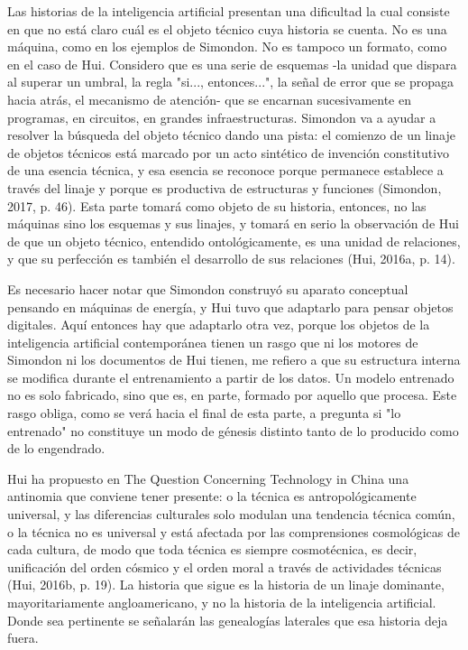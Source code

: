 Las historias de la inteligencia artificial presentan una dificultad la cual consiste en que no está claro cuál es el objeto técnico cuya historia se cuenta. No es una máquina, como en los ejemplos de Simondon. No es tampoco un formato, como en el caso de Hui. Considero que es una serie de esquemas -la unidad que dispara al superar un umbral, la regla "si..., entonces...", la señal de error que se propaga hacia atrás, el mecanismo de atención- que se encarnan sucesivamente en programas, en circuitos, en grandes infraestructuras. Simondon va a ayudar a resolver la búsqueda del objeto técnico dando una pista: el comienzo de un linaje de objetos técnicos está marcado por un acto sintético de invención constitutivo de una esencia técnica, y esa esencia se reconoce porque permanece establece a través del linaje y porque es productiva de estructuras y funciones (Simondon, 2017, p. 46). Esta parte tomará como objeto de su historia, entonces, no las máquinas sino los esquemas y sus linajes, y tomará en serio la observación de Hui de que un objeto técnico, entendido ontológicamente, es una unidad de relaciones, y que su perfección es también el desarrollo de sus relaciones (Hui, 2016a, p. 14).

Es necesario hacer notar que Simondon construyó su aparato conceptual pensando en máquinas de energía, y Hui tuvo que adaptarlo para pensar objetos digitales. Aquí entonces hay que adaptarlo otra vez, porque los objetos de la inteligencia artificial contemporánea tienen un rasgo que ni los motores de Simondon ni los documentos de Hui tienen, me refiero a que su estructura interna se modifica durante el entrenamiento a partir de los datos. Un modelo entrenado no es solo fabricado, sino que es, en parte, formado por aquello que procesa. Este rasgo obliga, como se verá hacia el final de esta parte, a pregunta si "lo entrenado" no constituye un modo de génesis distinto tanto de lo producido como de lo engendrado. 

Hui ha propuesto en The Question Concerning Technology in China una antinomia que conviene tener presente: o la técnica es antropológicamente universal, y las diferencias culturales solo modulan una tendencia técnica común, o la técnica no es universal y está afectada por las comprensiones cosmológicas de cada cultura, de modo que toda técnica es siempre cosmotécnica, es decir, unificación del orden cósmico y el orden moral a través de actividades técnicas (Hui, 2016b, p. 19). La historia que sigue es la historia de un linaje dominante, mayoritariamente angloamericano, y no la historia de la inteligencia artificial. Donde sea pertinente se señalarán las genealogías laterales que esa historia deja fuera.

